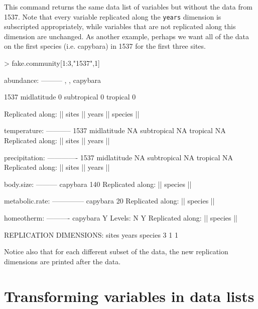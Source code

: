 \documentclass{article}
\newcommand{\code}[1]{\texttt{#1}}
\numberwithin{exercise}{section}
\begin{document}
This command returns the same data list of variables but without the data from 1537.  Note that every variable replicated along the \code{years} dimension is subscripted appropriately, while variables that are not replicated along this dimension are unchanged.  As another example, perhaps we want all of the data on the first species (i.e. capybara) in 1537 for the first three sites.
\begin{Schunk}
\begin{Sinput}
> fake.community[1:3,"1537",1]
\end{Sinput}
\begin{Soutput}
abundance:
---------
, , capybara

            1537
midlatitude    0
subtropical    0
tropical       0

Replicated along:  || sites || years || species || 


temperature:
-----------
            1537
midlatitude   NA
subtropical   NA
tropical      NA
Replicated along:  || sites || years || 


precipitation:
-------------
            1537
midlatitude   NA
subtropical   NA
tropical      NA
Replicated along:  || sites || years || 


body.size:
---------
capybara 
     140 
Replicated along:  || species || 


metabolic.rate:
--------------
capybara 
      20 
Replicated along:  || species || 


homeotherm:
----------
capybara 
       Y 
Levels: N Y
Replicated along:  || species || 


REPLICATION DIMENSIONS: 
  sites   years species 
      3       1       1 
\end{Soutput}
\end{Schunk}
Notice also that for each different subset of the data, the new replication dimensions are printed after the data.

\section{Transforming variables in data lists}
\end{document}
